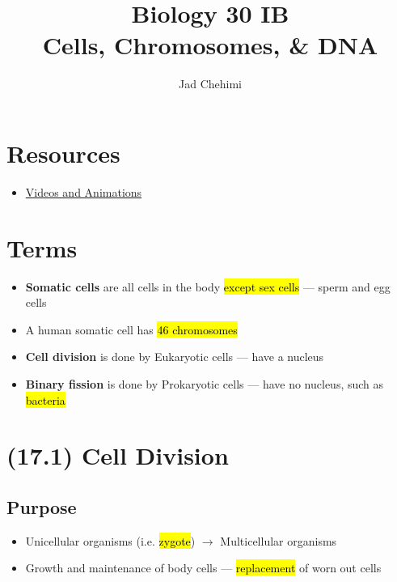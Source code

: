 \documentclass[a4paper,12pt]{article}
\title{Biology 30 IB \\ Cells, Chromosomes, \& DNA}
\author{Jad Chehimi}
\begin{document}
\maketitle

\section{Resources}
\begin{itemize}
    \item{\href{https://docs.google.com/document/d/1-Agcr85pflQCNP3PUO7vbdybJLy7BT0y3zjFPgRvhuI}{Videos and Animations}}
\end{itemize}

\tableofcontents

\pagebreak

\section{Terms}
\begin{itemize}
    \item{\textbf{Somatic cells} are all cells in the body \hl{except sex cells} --- sperm and egg cells}
    \item{A human somatic cell has \hl{46 chromosomes}}
    \item{\textbf{Cell division} is done by Eukaryotic cells --- have a nucleus}
    \item{\textbf{Binary fission} is done by Prokaryotic cells --- have no nucleus, such as \hl{bacteria}}
\end{itemize}

\section{(17.1) Cell Division}
\subsection{Purpose}
\begin{itemize}
    \item{Unicellular organisms (i.e. \hl{zygote}) $\longrightarrow$ Multicellular organisms}
    \item{Growth and maintenance of body cells --- \hl{replacement} of worn out cells}
\end{itemize}
\end{document}
